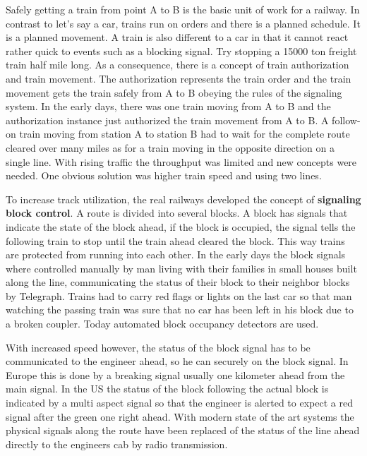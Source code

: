 

Safely getting a train from point A to B is the basic unit of work for a railway. In contrast to let's say a car, trains run on orders and there is a planned schedule. It is a planned movement. A train is also different to a car in that it cannot react rather quick to events such as a blocking signal. Try stopping a 15000 ton freight train half mile long. As a consequence, there is a concept of train authorization and train movement. The authorization represents the train order and the train movement gets the train safely from A to B obeying the rules of the signaling system. In the early days, there was one train moving from A to B and the authorization instance just authorized the train movement from A to B. A follow-on train moving from station A to station B had to wait for the complete route cleared over many miles as for a train moving in the opposite direction on a single line. With rising traffic the throughput was limited and new concepts were needed. One obvious solution was higher train speed and using two lines.

To increase track utilization, the real railways developed the concept of \textbf{signaling block control}. A route is divided into several blocks. A block has signals that indicate the state of the block ahead, if the block is occupied, the signal tells the following train to stop until the train ahead cleared the block. This way trains are protected from running into each other. In the early days the block signals where controlled manually by man living with their families in small houses built along the line, communicating the status of their block to their neighbor blocks by Telegraph. Trains had to carry red flags or lights on the last car so that man watching the passing train was sure that no car has been left in his block due to a broken coupler. Today automated block occupancy detectors are used.

With increased speed however, the status of the block signal has to be communicated to the engineer ahead, so he can  securely on the block signal. In Europe this is done by a breaking signal usually one kilometer ahead from the main signal. In the US the status of the block following the actual block is indicated by a multi aspect signal so that the engineer is alerted to expect a red signal after the green one right ahead. With modern state of the art systems the physical signals along the route have been replaced of the status of the line ahead directly to the engineers cab by radio transmission.

